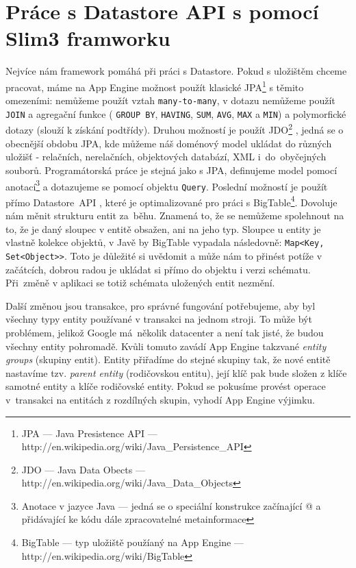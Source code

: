 \section{Práce s Datastore API s pomocí Slim3 framworku}
Nejvíce nám framework pomáhá při práci s Datastore. Pokud s uložištěm chceme pracovat, máme na App Engine možnost použít klasické JPA\footnote{JPA --- Java Presistence API --- http://en.wikipedia.org/wiki/Java\_Persistence\_API} \cite{web:jpa} s těmito omezeními: nemůžeme použít vztah \verb|many-to-many|, v dotazu nemůžeme použít \verb|JOIN| a agregační funkce ( \verb|GROUP BY|,  \verb|HAVING|,  \verb|SUM|,  \verb|AVG|,  \verb|MAX| a  \verb|MIN|) a polymorfické dotazy (slouží k získání podtřídy). Druhou možností je použít JDO\footnote{JDO --- Java Data Obects --- http://en.wikipedia.org/wiki/Java\_Data\_Objects} \cite{web:jdo}, jedná se o obecnější obdobu JPA, kde můžeme náš doménový model ukládat do různých uložišť - relačních, nerelačních, objektových databází,  XML i~do~obyčejných souborů. Programátorská práce je stejná jako s JPA, definujeme model pomocí anotací\footnote{Anotace v jazyce Java --- jedná se o speciální konstrukce začínající @ a přidávající ke kódu dále zpracovatelné metainformace} a dotazujeme se pomocí objektu \verb|Query|. Poslední možností je použít přímo Datastore~API \cite{web:datastore-api}, které je optimalizované pro práci s BigTable\footnote{BigTable --- typ uložiště použíaný na App Engine --- http://en.wikipedia.org/wiki/BigTable}. Dovoluje nám měnit strukturu entit za~běhu. Znamená to, že se nemůžeme spolehnout na to, že je daný sloupec v entitě obsažen, ani na jeho typ. Sloupce u entity je vlastně kolekce objektů, v Javě by BigTable vypadala následovně: \verb|Map<Key, Set<Object>>|. Toto je důležité si uvědomit a může nám to přinést potíže v začátcích, dobrou radou je ukládat si přímo do objektu i verzi schématu. Při~změně v aplikaci se totiž schémata uložených entit nezmění. 

Další změnou jsou transakce, pro správné fungování potřebujeme, aby byl všechny typy entity používané v transakci na jednom stroji. To může být problémem, jelikož Google má~několik datacenter a není tak jisté, že budou všechny entity pohromadě. Kvůli tomuto zavádí App Engine takzvané \emph{entity groups} (skupiny entit). Entity přiřadíme do stejné skupiny tak, že nové entitě nastavíme tzv. \emph{parent entity} (rodičovskou entitu), její klíč pak bude složen z klíče samotné entity a klíče rodičovské entity. Pokud se pokusíme provést operace v~transakci na entitách z rozdílných skupin, vyhodí App Engine výjimku.

